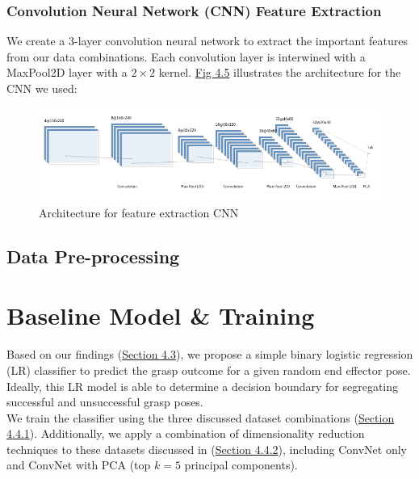 \documentclass[12pt, a4paper]{report}
\theoremstyle{definition}
\begin{document}
\subsubsection{Convolution Neural Network (CNN) Feature Extraction}
\label{sec:4.4.2.2}
We create a 3-layer convolution neural network to extract the important features from our data combinations. Each convolution layer is interwined with a MaxPool2D layer with a $2\times2$ kernel. \hyperref[fig:4.5]{Fig 4.5} illustrates the architecture for the CNN we used:
\begin{figure}[H]
    \includegraphics[scale=0.7]{docs/Project Report/Media/nn.png}
    \caption{Architecture for feature extraction CNN}
    \label{fig:4.5}
\end{figure}


\subsection{Data Pre-processing}
\label{sec:4.4.3}



\section{Baseline Model \& Training}
\label{sec:4.5}
Based on our findings (\hyperref[sec:4.3]{Section 4.3}), we propose a simple binary logistic regression (LR) classifier to predict the grasp outcome for a given random end effector pose. Ideally, this LR model is able to determine a decision boundary for segregating successful and unsuccessful grasp poses.\\

We train the classifier using the three discussed dataset combinations (\hyperref[sec:4.4.1]{Section 4.4.1}). Additionally, we apply a combination of dimensionality reduction techniques to these datasets discussed in (\hyperref[sec:4.4.2]{Section 4.4.2}), including ConvNet only and ConvNet with PCA (top $k=5$ principal components).
\end{document}
